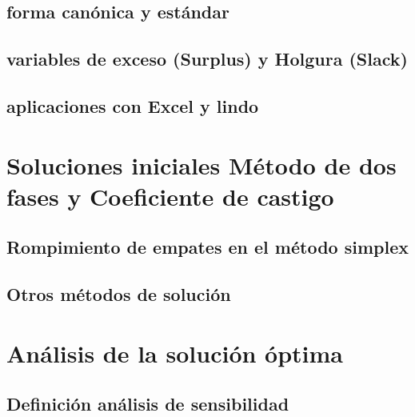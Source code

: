 \documentclass[
  letterpaper,
  DIV=11,
  numbers=noendperiod]{scrreprt}
\theoremstyle{definition}
\theoremstyle{definition}
\theoremstyle{remark}
\begin{document}
\hypertarget{forma-canuxf3nica-y-estuxe1ndar}{%
\subsection{forma canónica y
estándar}\label{forma-canuxf3nica-y-estuxe1ndar}}

\hypertarget{variables-de-exceso-surplus-y-holgura-slack}{%
\subsection{variables de exceso (Surplus) y Holgura
(Slack)}\label{variables-de-exceso-surplus-y-holgura-slack}}

\hypertarget{aplicaciones-con-excel-y-lindo}{%
\subsection{aplicaciones con Excel y
lindo}\label{aplicaciones-con-excel-y-lindo}}

\hypertarget{soluciones-iniciales-muxe9todo-de-dos-fases-y-coeficiente-de-castigo}{%
\section{Soluciones iniciales Método de dos fases y Coeficiente de
castigo}\label{soluciones-iniciales-muxe9todo-de-dos-fases-y-coeficiente-de-castigo}}

\hypertarget{rompimiento-de-empates-en-el-muxe9todo-simplex}{%
\subsection{Rompimiento de empates en el método
simplex}\label{rompimiento-de-empates-en-el-muxe9todo-simplex}}

\hypertarget{otros-muxe9todos-de-soluciuxf3n}{%
\subsection{Otros métodos de
solución}\label{otros-muxe9todos-de-soluciuxf3n}}

\hypertarget{anuxe1lisis-de-la-soluciuxf3n-uxf3ptima}{%
\section{Análisis de la solución
óptima}\label{anuxe1lisis-de-la-soluciuxf3n-uxf3ptima}}

\hypertarget{definiciuxf3n-anuxe1lisis-de-sensibilidad}{%
\subsection{Definición análisis de
sensibilidad}\label{definiciuxf3n-anuxe1lisis-de-sensibilidad}}
\end{document}
